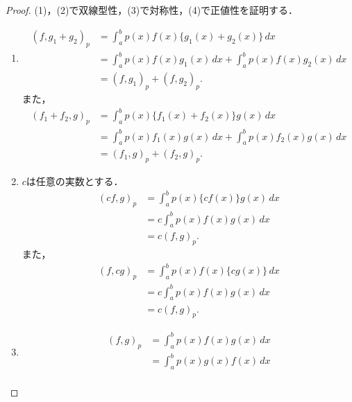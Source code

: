 \documentclass[a4paper,10pt,fleqn]{ltjsarticle}
\begin{document}
\begin{tleftbar}
    \begin{proof}
        (1)，(2)で双線型性，(3)で対称性，(4)で正値性を証明する．
        \begin{enumerate}[(1)]
            \item
                  \begin{align*}
                      (f,g_1+g_2)_p & = \int_{a}^{b} p(x) f(x) \{ g_1(x)+g_2(x) \} \, dx                           \\
                                    & = \int_{a}^{b} p(x) f(x) g_1 (x) \, dx + \int_{a}^{b} p(x) f(x) g_2(x) \, dx \\
                                    & = (f,g_1)_p + (f,g_2)_p.
                  \end{align*}
                  また，
                  \begin{align*} (f_1 + f_2 , g)_p & = \int_{a}^{b} p(x) \{ f_1(x)+f_2(x) \} g(x) \, dx                            \\
                                 & = \int_{a}^{b} p(x) f_1 (x) g(x) \, dx + \int_{a}^{b} p(x) f_2 (x) g(x) \, dx \\
                                 & = (f_1,g)_p + (f_2,g)_p.
                  \end{align*}
            \item $c$は任意の実数とする．
                  \begin{align*}
                      (cf,g)_p & = \int_{a}^{b} p(x) \{ cf(x) \} g(x) \, dx \\
                               & = c \int_{a}^{b} p(x) f(x) g(x) \, dx      \\
                               & = c(f,g)_p .
                  \end{align*}
                  また，
                  \begin{align*}
                      (f,cg)_p & = \int_{a}^{b} p(x) f(x) \{ cg(x) \} \, dx \\
                               & = c \int_{a}^{b} p(x) f(x) g(x) \, dx      \\
                               & = c(f,g)_p .
                  \end{align*}
            \item
                  \begin{align*}
                      (f,g)_p & = \int_{a}^{b} p(x) f(x) g(x) \, dx \\
                              & = \int_{a}^{b} p(x) g(x) f(x) \, dx \\

\end{align*}
\end{enumerate}
\end{proof}
\end{tleftbar}
\end{document}
